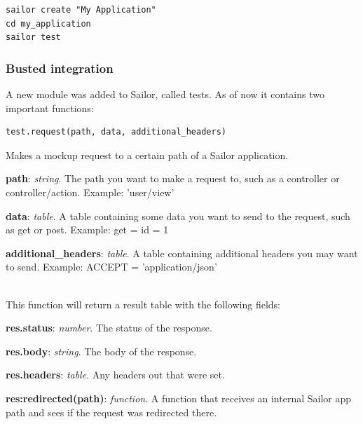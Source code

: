 \documentclass{article}
\begin{document}
\lstset{language=Bash}    
\begin{lstlisting}[frame=single]
sailor create "My Application"
cd my_application
sailor test
\end{lstlisting}


\subsubsection{Busted integration}

A new module was added to Sailor, called tests. As of now it contains two important functions:

\lstset{language=Lua}    
\begin{lstlisting}[frame=single]
test.request(path, data, additional_headers)
\end{lstlisting}

Makes a mockup request to a certain path of a Sailor application.

\begin{description}\item \textbf{path}: \textit{string}. The path you want to make a request to, such as a controller or controller/action. Example: 'user/view'
\item \textbf{data}: \textit{table}. A table containing some data you want to send to the request, such as get or post. Example: {get = {id = 1}}
\item \textbf{additional\_headers}: \textit{table}. A table containing additional headers you may want to send. Example: {ACCEPT = 'application/json'}
\end{description}\\

This function will return a result table with the following fields:\\
\begin{description}\item \textbf{res.status}: \textit{number}. The status of the response.
\item \textbf{res.body}: \textit{string}. The body of the response.
\item \textbf{res.headers}: \textit{table}. Any headers out that were set.
\item \textbf{res:redirected(path)}: \textit{function}. A function that receives an internal Sailor app path and sees if the request was redirected there.\\
\end{description}\\
\end{document}
